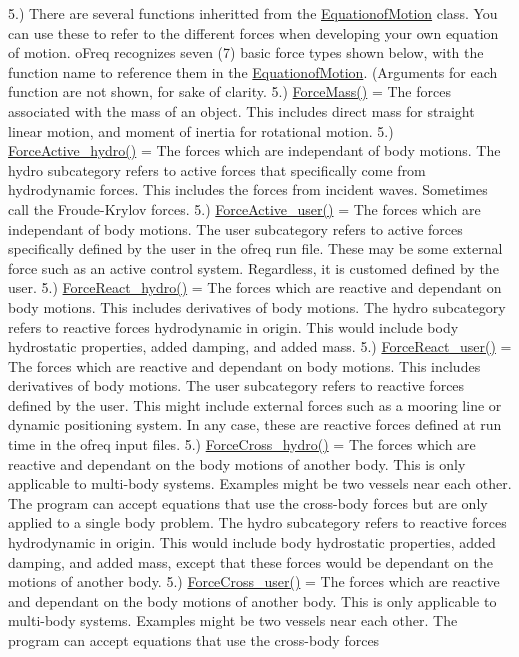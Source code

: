 5.) There are several functions inheritted from the \hyperlink{classosea_1_1ofreq_1_1_equationof_motion}{Equationof\-Motion} class. You can use these to refer to the different forces when developing your own equation of motion. o\-Freq recognizes seven (7) basic force types shown below, with the function name to reference them in the \hyperlink{classosea_1_1ofreq_1_1_equationof_motion}{Equationof\-Motion}. (Arguments for each function are not shown, for sake of clarity. 5.) \hyperlink{classosea_1_1ofreq_1_1_equationof_motion_a848b45b70d29d793b86a7c1ca8f97ed6}{Force\-Mass()} = The forces associated with the mass of an object. This includes direct mass for straight linear motion, and moment of inertia for rotational motion. 5.) \hyperlink{classosea_1_1ofreq_1_1_equationof_motion_a61f33c3fd47ae2b66db1982b9c973ec1}{Force\-Active\-\_\-hydro()} = The forces which are independant of body motions. The hydro subcategory refers to active forces that specifically come from hydrodynamic forces. This includes the forces from incident waves. Sometimes call the Froude-\/\-Krylov forces. 5.) \hyperlink{classosea_1_1ofreq_1_1_equationof_motion_a238df115825cbe08522bdc10b84880b9}{Force\-Active\-\_\-user()} = The forces which are independant of body motions. The user subcategory refers to active forces specifically defined by the user in the ofreq run file. These may be some external force such as an active control system. Regardless, it is customed defined by the user. 5.) \hyperlink{classosea_1_1ofreq_1_1_equationof_motion_a4962df48c786fced4e953e50f1d82a3a}{Force\-React\-\_\-hydro()} = The forces which are reactive and dependant on body motions. This includes derivatives of body motions. The hydro subcategory refers to reactive forces hydrodynamic in origin. This would include body hydrostatic properties, added damping, and added mass. 5.) \hyperlink{classosea_1_1ofreq_1_1_equationof_motion_ac1f572e423c09b9e9fa955f52434a8f7}{Force\-React\-\_\-user()} = The forces which are reactive and dependant on body motions. This includes derivatives of body motions. The user subcategory refers to reactive forces defined by the user. This might include external forces such as a mooring line or dynamic positioning system. In any case, these are reactive forces defined at run time in the ofreq input files. 5.) \hyperlink{classosea_1_1ofreq_1_1_equationof_motion_af1d1f42b77561e9f1c4110e16af309da}{Force\-Cross\-\_\-hydro()} = The forces which are reactive and dependant on the body motions of another body. This is only applicable to multi-\/body systems. Examples might be two vessels near each other. The program can accept equations that use the cross-\/body forces but are only applied to a single body problem. The hydro subcategory refers to reactive forces hydrodynamic in origin. This would include body hydrostatic properties, added damping, and added mass, except that these forces would be dependant on the motions of another body. 5.) \hyperlink{classosea_1_1ofreq_1_1_equationof_motion_a3b06b1ff4b792ad3a3d3c0274426d5ed}{Force\-Cross\-\_\-user()} = The forces which are reactive and dependant on the body motions of another body. This is only applicable to multi-\/body systems. Examples might be two vessels near each other. The program can accept equations that use the cross-\/body forces 